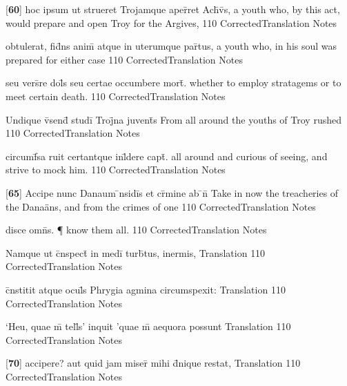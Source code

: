 \latline
  {[\textbf{60}] hoc ipsum ut strueret Trojamque aper\={\macron {\i}}ret Ach\={\macron {\i}}v\={\macron {\i}}s,}
  { a youth who, by this act, would prepare and open Troy for the Argives, }
  {110}
  { CorrectedTranslation }
  { Notes }


\latline
  {obtulerat, fid\={}ns anim\={\macron {\i}} atque in uterumque par\={}tus,}
  { a youth who, in his soul was prepared for either case }
  {110}
  { CorrectedTranslation }
  { Notes }


\latline
  {seu vers\={}re dol\={}s seu certae occumbere mort\={\macron {\i}}.}
  { whether to employ stratagems or to meet certain death. }
  {110}
  { CorrectedTranslation }
  { Notes }


\latline
  {Undique v\={\macron {\i}}send\={\macron {\i}} studi\={} Troj\={}na juvent\={}s}
  { From all around the youths of Troy rushed }
  {110}
  { CorrectedTranslation }
  { Notes }


\latline
  {circumf\={}sa ruit certantque inl\={}dere capt\={}.}
  { all around and curious of seeing, and strive to mock him. }
  {110}
  { CorrectedTranslation }
  { Notes }


\latline
  {[\textbf{65}] Accipe nunc Danaum \={\macron {\i}}nsidi\={}s et cr\={\macron {\i}}mine ab \={}n\={}}
  { Take in now the treacheries of the Dana\"ans, and from the crimes of one }
  {110}
  { CorrectedTranslation }
  { Notes }


\latline
  {disce omn\={\macron {\i}}s. \P}
  { know them all. }
  {110}
  { CorrectedTranslation }
  { Notes }


\latline
  {Namque ut c\={}nspect\={} in medi\={} turb\={}tus, inermis, }
  { Translation }
  {110}
  { CorrectedTranslation }
  { Notes }


\latline
  {c\={}nstitit atque ocul\={\macron {\i}}s Phrygia agmina circumspexit:}
  { Translation }
  {110}
  { CorrectedTranslation }
  { Notes }


\latline
  {`Heu, quae m\={} tell\={}s' inquit 'quae m\={} aequora possunt}
  { Translation }
  {110}
  { CorrectedTranslation }
  { Notes }


\latline
  {[\textbf{70}] accipere? aut quid jam miser\={} mihi d\={}nique restat,}
  { Translation }
  {110}
  { CorrectedTranslation }
  { Notes }


